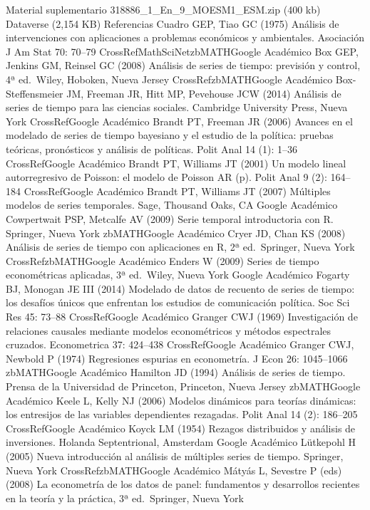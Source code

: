 \documentclass[
]{book}
\begin{document}
Material suplementario
318886\_1\_En\_9\_MOESM1\_ESM.zip (400 kb)
Dataverse (2,154 KB)
Referencias
Cuadro GEP, Tiao GC (1975) Análisis de intervenciones con aplicaciones a problemas económicos y ambientales. Asociación J Am Stat 70: 70--79
CrossRefMathSciNetzbMATHGoogle Académico
Box GEP, Jenkins GM, Reinsel GC (2008) Análisis de series de tiempo: previsión y control, 4ª ed.~Wiley, Hoboken, Nueva Jersey
CrossRefzbMATHGoogle Académico
Box-Steffensmeier JM, Freeman JR, Hitt MP, Pevehouse JCW (2014) Análisis de series de tiempo para las ciencias sociales. Cambridge University Press, Nueva York
CrossRefGoogle Académico
Brandt PT, Freeman JR (2006) Avances en el modelado de series de tiempo bayesiano y el estudio de la política: pruebas teóricas, pronósticos y análisis de políticas. Polit Anal 14 (1): 1--36
CrossRefGoogle Académico
Brandt PT, Williams JT (2001) Un modelo lineal autorregresivo de Poisson: el modelo de Poisson AR (p). Polit Anal 9 (2): 164--184
CrossRefGoogle Académico
Brandt PT, Williams JT (2007) Múltiples modelos de series temporales. Sage, Thousand Oaks, CA
Google Académico
Cowpertwait PSP, Metcalfe AV (2009) Serie temporal introductoria con R. Springer, Nueva York
zbMATHGoogle Académico
Cryer JD, Chan KS (2008) Análisis de series de tiempo con aplicaciones en R, 2ª ed.~Springer, Nueva York
CrossRefzbMATHGoogle Académico
Enders W (2009) Series de tiempo econométricas aplicadas, 3ª ed.~Wiley, Nueva York
Google Académico
Fogarty BJ, Monogan JE III (2014) Modelado de datos de recuento de series de tiempo: los desafíos únicos que enfrentan los estudios de comunicación política. Soc Sci Res 45: 73--88
CrossRefGoogle Académico
Granger CWJ (1969) Investigación de relaciones causales mediante modelos econométricos y métodos espectrales cruzados. Econometrica 37: 424--438
CrossRefGoogle Académico
Granger CWJ, Newbold P (1974) Regresiones espurias en econometría. J Econ 26: 1045--1066
zbMATHGoogle Académico
Hamilton JD (1994) Análisis de series de tiempo. Prensa de la Universidad de Princeton, Princeton, Nueva Jersey
zbMATHGoogle Académico
Keele L, Kelly NJ (2006) Modelos dinámicos para teorías dinámicas: los entresijos de las variables dependientes rezagadas. Polit Anal 14 (2): 186--205
CrossRefGoogle Académico
Koyck LM (1954) Rezagos distribuidos y análisis de inversiones. Holanda Septentrional, Amsterdam
Google Académico
Lütkepohl H (2005) Nueva introducción al análisis de múltiples series de tiempo. Springer, Nueva York
CrossRefzbMATHGoogle Académico
Mátyás L, Sevestre P (eds) (2008) La econometría de los datos de panel: fundamentos y desarrollos recientes en la teoría y la práctica, 3ª ed.~Springer, Nueva York
\end{document}
